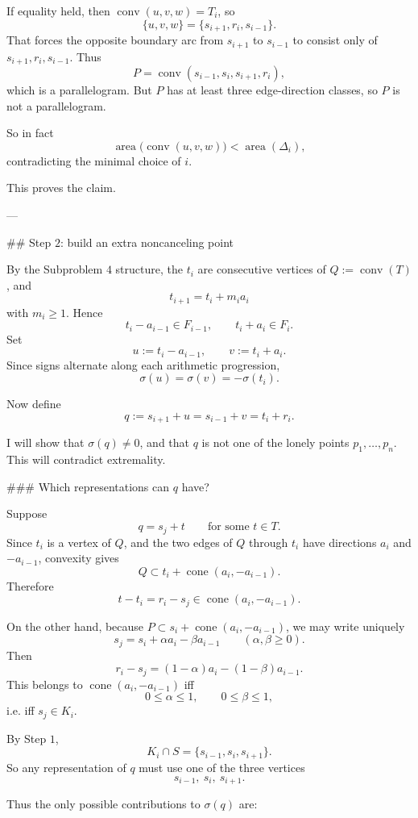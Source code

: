 If equality held, then \(\operatorname{conv}(u,v,w)=T_i\), so
\[
\{u,v,w\}=\{s_{i+1},r_i,s_{i-1}\}.
\]
That forces the opposite boundary arc from \(s_{i+1}\) to \(s_{i-1}\) to consist only of \(s_{i+1},r_i,s_{i-1}\). Thus
\[
P=\operatorname{conv}(s_{i-1},s_i,s_{i+1},r_i),
\]
which is a parallelogram. But \(P\) has at least three edge-direction classes, so \(P\) is not a parallelogram.

So in fact
\[
\operatorname{area}\bigl(\operatorname{conv}(u,v,w)\bigr)
< \operatorname{area}(\Delta_i),
\]
contradicting the minimal choice of \(i\).

This proves the claim.

---

## Step \(2\): build an extra noncanceling point

By the Subproblem \(4\) structure, the \(t_i\) are consecutive vertices of \(Q:=\operatorname{conv}(T)\), and
\[
t_{i+1}=t_i+m_i a_i
\]
with \(m_i\ge 1\). Hence
\[
t_i-a_{i-1}\in F_{i-1},\qquad t_i+a_i\in F_i.
\]
Set
\[
u:=t_i-a_{i-1},\qquad v:=t_i+a_i.
\]
Since signs alternate along each arithmetic progression,
\[
\sigma(u)=\sigma(v)=-\sigma(t_i).
\]

Now define
\[
q:=s_{i+1}+u=s_{i-1}+v=t_i+r_i.
\]

I will show that \(\sigma(q)\neq 0\), and that \(q\) is not one of the lonely points \(p_1,\dots,p_n\). This will contradict extremality.

### Which representations can \(q\) have?

Suppose
\[
q=s_j+t
\qquad\text{for some }t\in T.
\]
Since \(t_i\) is a vertex of \(Q\), and the two edges of \(Q\) through \(t_i\) have directions \(a_i\) and \(-a_{i-1}\), convexity gives
\[
Q\subset t_i+\operatorname{cone}(a_i,-a_{i-1}).
\]
Therefore
\[
t-t_i=r_i-s_j\in \operatorname{cone}(a_i,-a_{i-1}).
\]

On the other hand, because \(P\subset s_i+\operatorname{cone}(a_i,-a_{i-1})\), we may write uniquely
\[
s_j=s_i+\alpha a_i-\beta a_{i-1}
\qquad (\alpha,\beta\ge 0).
\]
Then
\[
r_i-s_j=(1-\alpha)a_i-(1-\beta)a_{i-1}.
\]
This belongs to \(\operatorname{cone}(a_i,-a_{i-1})\) iff
\[
0\le \alpha\le 1,\qquad 0\le \beta\le 1,
\]
i.e. iff \(s_j\in K_i\).

By Step \(1\),
\[
K_i\cap S=\{s_{i-1},s_i,s_{i+1}\}.
\]
So any representation of \(q\) must use one of the three vertices
\[
s_{i-1},\ s_i,\ s_{i+1}.
\]

Thus the only possible contributions to \(\sigma(q)\) are:

